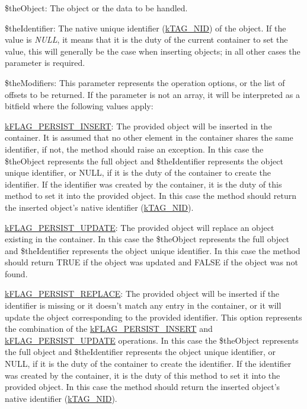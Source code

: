 \begin{DoxyItemize}
\item {\ttfamily \$the\-Object}\-: The object or the data to be handled. 
\item {\ttfamily \$the\-Identifier}\-: The native unique identifier (\hyperlink{}{k\-T\-A\-G\-\_\-\-N\-I\-D}) of the object. If the value is {\itshape N\-U\-L\-L}, it means that it is the duty of the current container to set the value, this will generally be the case when inserting objects; in all other cases the parameter is required. 
\item {\ttfamily \$the\-Modifiers}\-: This parameter represents the operation options, or the list of offsets to be returned. If the parameter is not an array, it will be interpreted as a bitfield where the following values apply\-: 
\begin{DoxyItemize}
\item \hyperlink{}{k\-F\-L\-A\-G\-\_\-\-P\-E\-R\-S\-I\-S\-T\-\_\-\-I\-N\-S\-E\-R\-T}\-: The provided object will be inserted in the container. It is assumed that no other element in the container shares the same identifier, if not, the method should raise an exception. In this case the {\ttfamily \$the\-Object} represents the full object and {\ttfamily \$the\-Identifier} represents the object unique identifier, or {\ttfamily N\-U\-L\-L}, if it is the duty of the container to create the identifier. If the identifier was created by the container, it is the duty of this method to set it into the provided object. In this case the method should return the inserted object's native identifier (\hyperlink{}{k\-T\-A\-G\-\_\-\-N\-I\-D}). 
\item \hyperlink{}{k\-F\-L\-A\-G\-\_\-\-P\-E\-R\-S\-I\-S\-T\-\_\-\-U\-P\-D\-A\-T\-E}\-: The provided object will replace an object existing in the container. In this case the {\ttfamily \$the\-Object} represents the full object and {\ttfamily \$the\-Identifier} represents the object unique identifier. In this case the method should return {\ttfamily T\-R\-U\-E} if the object was updated and {\ttfamily F\-A\-L\-S\-E} if the object was not found. 
\item \hyperlink{}{k\-F\-L\-A\-G\-\_\-\-P\-E\-R\-S\-I\-S\-T\-\_\-\-R\-E\-P\-L\-A\-C\-E}\-: The provided object will be inserted if the identifier is missing or it doesn't match any entry in the container, or it will update the object corresponding to the provided identifier. This option represents the combination of the \hyperlink{}{k\-F\-L\-A\-G\-\_\-\-P\-E\-R\-S\-I\-S\-T\-\_\-\-I\-N\-S\-E\-R\-T} and \hyperlink{}{k\-F\-L\-A\-G\-\_\-\-P\-E\-R\-S\-I\-S\-T\-\_\-\-U\-P\-D\-A\-T\-E} operations. In this case the {\ttfamily \$the\-Object} represents the full object and {\ttfamily \$the\-Identifier} represents the object unique identifier, or {\ttfamily N\-U\-L\-L}, if it is the duty of the container to create the identifier. If the identifier was created by the container, it is the duty of this method to set it into the provided object. In this case the method should return the inserted object's native identifier (\hyperlink{}{k\-T\-A\-G\-\_\-\-N\-I\-D}). 

\end{DoxyItemize}
\end{DoxyItemize}

